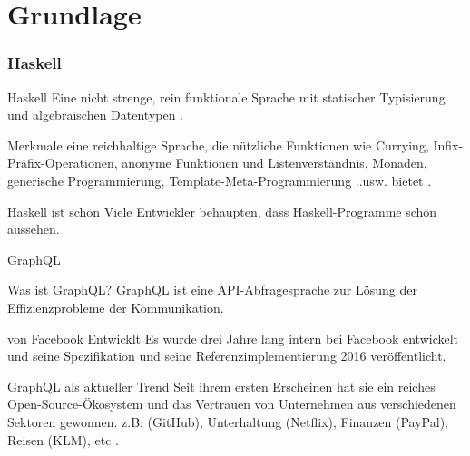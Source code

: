 
\section{Grundlage}

\begin{frame}\frametitle{Haskell}

    \footnotesize
    \begin{block}{Haskell}
        Eine \alert{nicht strenge}, \alert{rein funktionale} Sprache mit statischer 
        Typisierung und algebraischen Datentypen \cite{history-of-haskell}.
    \end{block}

    \begin{block}{Merkmale}
        eine reichhaltige Sprache, die nützliche Funktionen wie 
        Currying, Infix-Präfix-Operationen, anonyme Funktionen und
        Listenverständnis, Monaden, 
        generische Programmierung, 
        Template-Meta-Programmierung 
        ..usw. bietet \cite{history-of-haskell}.
    \end{block}

    \begin{block}{Haskell ist schön}
        Viele Entwickler behaupten, dass Haskell-Programme schön aussehen. 
        \cite{history-of-haskell} 
    \end{block}

\end{frame}

\begin{frame}{GraphQL}

    \footnotesize

    \begin{block}{Was ist GraphQL?}
        GraphQL ist eine API-Abfragesprache zur Lösung der Effizienzprobleme der Kommunikation\cite{gql-iot}.         
    \end{block}

    \begin{block}{von Facebook Entwicklt}
        Es wurde drei Jahre lang intern bei Facebook entwickelt und seine Spezifikation und seine Referenzimplementierung 2016 veröffentlicht.
        \cite{initial-analysis-of-gql}
    \end{block}

    \begin{block}{GraphQL als aktueller Trend}
        Seit ihrem ersten Erscheinen hat sie ein reiches Open-Source-Ökosystem und das Vertrauen von Unternehmen aus verschiedenen Sektoren gewonnen. z.B: (GitHub), Unterhaltung (Netflix), Finanzen (PayPal), Reisen (KLM), etc \cite{morph-gql-1,gql-healthcare}.
    \end{block}

\end{frame}


